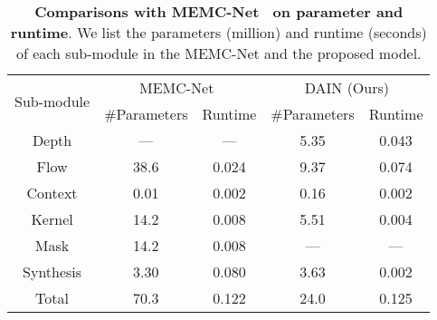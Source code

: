 \documentclass[10pt,twocolumn,letterpaper]{article}
\def\OurTPAMIs{MEMC-Net}
\def\Ours{DAIN}
\begin{document}
	
	
	
\begin{table}
\caption{
		\textbf{Comparisons with MEMC-Net~\cite{bao2018MEMC-Net} on parameter and runtime}.
We list the parameters (million) and runtime (seconds) of each sub-module in the MEMC-Net and the proposed model.
		}
	\vspace{-5pt}
	\label{tab:detailtime}
	\footnotesize
\centering
	\begin{tabular}{ccccc}
\toprule 	
\multirow{2}{*}[-0.28em]{Sub-module}	&\multicolumn{2}{c}{\OurTPAMIs~\cite{bao2018MEMC-Net}} & \multicolumn{2}{c}{\Ours{} (Ours)}\\
			\cmidrule(l{2pt}r{2pt}){2-3}
			\cmidrule(l{2pt}r{2pt}){4-5}
			&\#Parameters &Runtime &\#Parameters &Runtime \\
			\addlinespace[-1pt]
			\midrule
Depth &---&--- &  5.35 & 0.043 \\
 
Flow   & 38.6 & 0.024 & 9.37 &0.074 \\
Context & 0.01 & 0.002 & 0.16 & 0.002 \\
Kernel  & 14.2 & 0.008 & 5.51 & 0.004 \\
Mask  &   14.2 & 0.008 & --- & --- \\
Synthesis  &  3.30 & 0.080& 3.63 & 0.002 \\
\midrule
Total	 & 70.3 & 0.122 & 24.0 & 0.125 \\
\bottomrule
	\end{tabular} 
\vspace{-5pt}
\end{table}







 	
\end{document}

